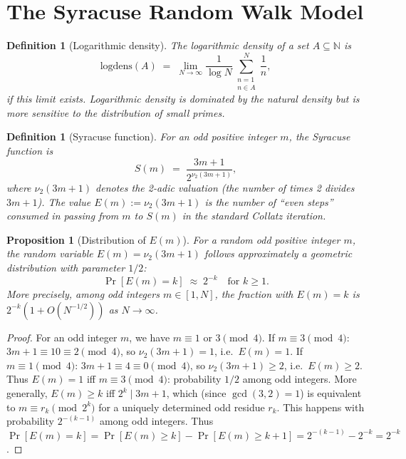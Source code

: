 \documentclass[12pt,a4paper]{article}
\newtheorem{proposition}[theorem]{Proposition}
\newtheorem{definition}[theorem]{Definition}
\begin{document}
\section{The Syracuse Random Walk Model}

\begin{definition}[Logarithmic density]\label{def:logdens}
The \emph{logarithmic density} of a set $A \subseteq \mathbb{N}$ is
\[
  \mathrm{logdens}(A) \;=\; \lim_{N \to \infty} \frac{1}{\log N} \sum_{\substack{n=1 \\ n \in A}}^{N} \frac{1}{n},
\]
if this limit exists. Logarithmic density is dominated by the natural density but is
more sensitive to the distribution of small primes.
\end{definition}

\begin{definition}[Syracuse function]\label{def:syracuse}
For an odd positive integer $m$, the \emph{Syracuse function} is
\[
  S(m) \;=\; \frac{3m+1}{2^{\nu_2(3m+1)}},
\]
where $\nu_2(3m+1)$ denotes the 2-adic valuation (the number of times 2 divides $3m+1$).
The value $E(m) := \nu_2(3m+1)$ is the number of ``even steps'' consumed in passing from
$m$ to $S(m)$ in the standard Collatz iteration.
\end{definition}

\begin{proposition}[Distribution of $E(m)$]\label{prop:dist_E}
For a random odd positive integer $m$, the random variable $E(m) = \nu_2(3m+1)$ follows
approximately a geometric distribution with parameter $1/2$:
\[
  \Pr[E(m) = k] \;\approx\; 2^{-k} \quad \text{for } k \geq 1.
\]
More precisely, among odd integers $m \in [1, N]$, the fraction with $E(m) = k$ is
$2^{-k}(1 + O(N^{-1/2}))$ as $N \to \infty$.
\end{proposition}

\begin{proof}
For an odd integer $m$, we have $m \equiv 1$ or $3 \pmod{4}$.
If $m \equiv 3 \pmod{4}$: $3m+1 \equiv 10 \equiv 2 \pmod{4}$, so $\nu_2(3m+1) = 1$, i.e.\ $E(m)=1$.
If $m \equiv 1 \pmod{4}$: $3m+1 \equiv 4 \equiv 0 \pmod{4}$, so $\nu_2(3m+1) \geq 2$, i.e.\ $E(m)\geq 2$.
Thus $E(m) = 1$ iff $m \equiv 3 \pmod{4}$: probability $1/2$ among odd integers.
More generally, $E(m) \geq k$ iff $2^k \mid 3m+1$, which (since $\gcd(3,2)=1$) is equivalent to
$m \equiv r_k \pmod{2^k}$ for a uniquely determined odd residue $r_k$.
This happens with probability $2^{-(k-1)}$ among odd integers.
Thus $\Pr[E(m) = k] = \Pr[E(m) \geq k] - \Pr[E(m) \geq k+1] = 2^{-(k-1)} - 2^{-k} = 2^{-k}$.
\end{proof}
\end{document}
